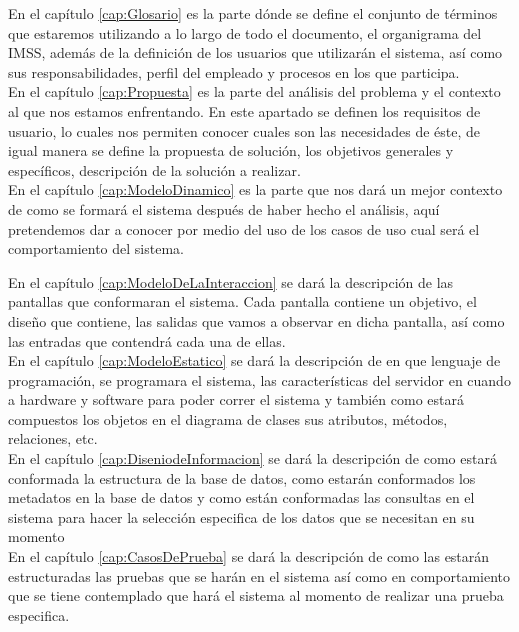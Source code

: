 En el capítulo \ref{cap:Glosario} es la parte dónde se define el conjunto de términos que estaremos utilizando a lo largo de todo el documento, el organigrama del IMSS, además de la definición de los usuarios que utilizarán el sistema, así como sus responsabilidades, perfil del empleado y procesos en los que participa. \\

En el capítulo \ref{cap:Propuesta} es la parte del análisis del problema y el contexto al que nos estamos enfrentando. En este apartado se definen los requisitos de usuario, lo cuales nos permiten conocer cuales son las necesidades de éste, de igual manera se define la propuesta de solución, los objetivos generales y específicos, descripción de la solución a realizar. \\

En el capítulo \ref{cap:ModeloDinamico} es la parte que nos dará un mejor contexto de como se formará el sistema después de haber hecho el análisis, aquí pretendemos dar a conocer por medio del uso de los casos de uso cual será el comportamiento del sistema.

En el capítulo \ref{cap:ModeloDeLaInteraccion} se dará la descripción de las pantallas que conformaran el sistema. Cada pantalla contiene un objetivo, el diseño que contiene, las salidas que vamos a observar en dicha pantalla, así como las entradas que contendrá cada una de ellas. \\

En el capítulo \ref{cap:ModeloEstatico} se dará la descripción de en que lenguaje de programación, se programara el sistema, las características del servidor en cuando a hardware y software para poder correr el sistema y también como estará compuestos los objetos en el diagrama de clases sus atributos, métodos, relaciones, etc. \\

En el capítulo \ref{cap:DiseniodeInformacion} se dará la descripción de como estará conformada la estructura de la base de datos, como estarán conformados los metadatos en la base de datos y como están conformadas las consultas en el sistema para hacer la selección especifica de los datos que se necesitan en su momento\\

En el capítulo \ref{cap:CasosDePrueba} se dará la descripción de como las estarán estructuradas las pruebas que se harán en el sistema así como en comportamiento que se tiene contemplado que hará el sistema al momento de realizar una prueba especifica. \\

